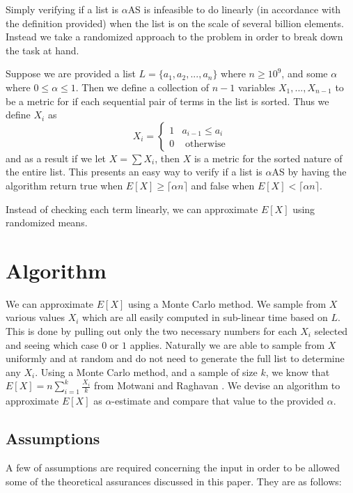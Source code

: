 \documentclass[11pt]{article}
\begin{document}
Simply verifying if a list is $\alpha$AS is infeasible to do linearly (in accordance with the definition provided) when the list is on the scale of several billion elements. Instead we take a randomized approach to the problem in order to break down the task at hand. 

Suppose we are provided a list $L = \{a_1, a_2, ..., a_n\}$ where $n \geq 10^9$, and some $\alpha$ where $0 \leq \alpha \leq 1$. Then we define a collection of $n-1$ variables $X_1, ..., X_{n-1}$ to be a metric for if each sequential pair of terms in the list is sorted. Thus we define $X_i$ as
$$X_i = 
\begin{cases}
	1 & a_{i-1} \leq a_i \\
	0 & \text{ otherwise}
\end{cases}$$
and as a result if we let $X = \sum X_i$, then $X$ is a metric for the sorted nature of the entire list. This presents an easy way to verify if a list is $\alpha$AS by having the algorithm return true when $E[X] \geq \lceil \alpha n \rceil$ and false when $E[X] < \lceil \alpha n \rceil$.

Instead of checking each term linearly, we can approximate $E[X]$ using randomized means. 

\section{Algorithm}

We can approximate $E[X]$ using a Monte Carlo method. We sample from $X$ various values $X_i$ which are all easily computed in sub-linear time based on $L$. This is done by pulling out only the two necessary numbers for each $X_i$ selected and seeing which case $0$ or $1$ applies. Naturally we are able to sample from $X$ uniformly and at random and do not need to generate the full list to determine any $X_i$. Using a Monte Carlo method, and a sample of size $k$, we know that $E[X] = n \sum\limits^k_{i=1} \frac{X_i}{k}$ from Motwani and Raghavan \cite{textbook}. We devise an algorithm to approximate $E[X]$ as $\alpha$-estimate and compare that value to the provided $\alpha$. 

\subsection{Assumptions}

A few of assumptions are required concerning the input in order to be allowed some of the theoretical assurances discussed in this paper. They are as follows:
\end{document}
